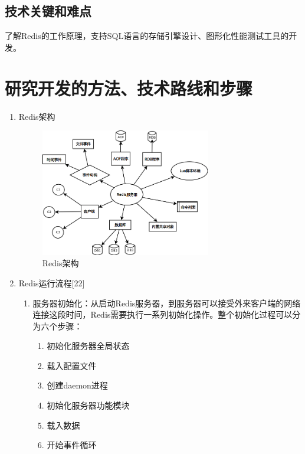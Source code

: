 \documentclass[proposal]{zjutreport}
\begin{document}
\section{技术关键和难点}
了解Redis的工作原理，支持SQL语言的存储引擎设计、图形化性能测试工具的开发。

\chapter{研究开发的方法、技术路线和步骤}

\begin{enumerate}[label=（\arabic*）]
\item{Redis架构

\begin{figure}[htbp]
\centering
\includegraphics[width=0.7\textwidth]{redis-server}
\caption{Redis架构}\label{fig:redis-server}
\vspace{\baselineskip}
\end{figure}
}%

\item{Redis运行流程[22]

\begin{enumerate}[label=\arabic*.]
\item{服务器初始化：从启动Redis服务器，到服务器可以接受外来客户端的网络连接这段时间，Redis需要执行一系列初始化操作。整个初始化过程可以分为六个步骤：
\begin{enumerate}[label=\Roman{*}.]
\item{初始化服务器全局状态}
\item{载入配置文件}
\item{创建daemon进程}
\item{初始化服务器功能模块}
\item{载入数据}
\item{开始事件循环}
\end{enumerate}
}


\end{enumerate}}
\end{enumerate}
\end{document}
